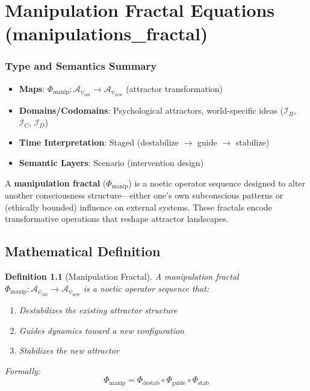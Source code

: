 \documentclass[11pt,twoside]{book}
\newcommand{\Ideas}{\mathcal{I}}
\newcommand{\Frac}{\Phi}
\newcommand{\PsychAttractor}{\mathcal{A}_\psi}
\newcommand{\ManipFrac}{\Phi_{\mathrm{manip}}}
\newcommand{\IdeasB}{\Ideas_B}     %
\newcommand{\IdeasC}{\Ideas_C}     %
\newcommand{\IdeasD}{\Ideas_D}     %
\newtheorem{definition}{Definition}[chapter]
\begin{document}
\chapter{Manipulation Fractal Equations (manipulations\_fractal)}
\label{ch:manipulation-fractal}

\subsection*{Type and Semantics Summary}
\begin{itemize}
    \item \textbf{Maps}: $\ManipFrac : \PsychAttractor_{\mathrm{old}} \to \PsychAttractor_{\mathrm{new}}$ (attractor transformation)
    \item \textbf{Domains/Codomains}: Psychological attractors, world-specific ideas ($\IdeasB$, $\IdeasC$, $\IdeasD$)
    \item \textbf{Time Interpretation}: Staged (destabilize $\to$ guide $\to$ stabilize)
    \item \textbf{Semantic Layers}: Scenario (intervention design)
\end{itemize}

\begin{tcolorbox}[colback=orange!5!white,colframe=orange!75!black,title=\textbf{Definition: Manipulation Fractal},breakable]
A \textbf{manipulation fractal} ($\ManipFrac$) is a noetic operator sequence designed
to alter another consciousness structure---either one's own subconscious patterns or
(ethically bounded) influence on external systems. These fractals encode
transformative operations that reshape attractor landscapes.
\end{tcolorbox}

\section{Mathematical Definition}

\begin{definition}[Manipulation Fractal]
\label{def:manip-fractal}
A \emph{manipulation fractal} $\ManipFrac : \PsychAttractor_{\mathrm{old}} \to
\PsychAttractor_{\mathrm{new}}$ is a noetic operator sequence that:
\begin{enumerate}[label=(\roman*)]
    \item Destabilizes the existing attractor structure
    \item Guides dynamics toward a new configuration
    \item Stabilizes the new attractor
\end{enumerate}
Formally:
\[
    \ManipFrac = \Frac_{\mathrm{destab}} \circ \Frac_{\mathrm{guide}} \circ \Frac_{\mathrm{stab}}
\]
\end{definition}
\end{document}
